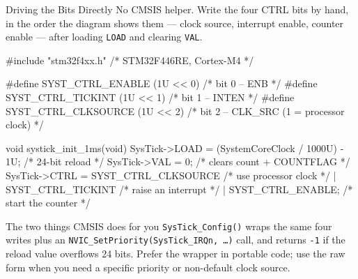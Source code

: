 \documentclass[9pt,aspectratio=169,xcolor=table]{beamer}
\begin{document}
{\beamerextras
\begin{frame}[fragile]{Driving the Bits Directly}
    \leavevmode
    {\small No CMSIS helper. Write the four CTRL bits by hand, in the order
    the diagram shows them --- clock source, interrupt enable, counter
    enable --- after loading \texttt{LOAD} and clearing \texttt{VAL}.}

    \vspace{2mm}
\begin{cc}[basicstyle=\ttfamily\footnotesize]
#include "stm32f4xx.h"                 /* STM32F446RE, Cortex-M4 */

#define SYST_CTRL_ENABLE     (1U << 0) /* bit 0  -- ENB */
#define SYST_CTRL_TICKINT    (1U << 1) /* bit 1  -- INTEN */
#define SYST_CTRL_CLKSOURCE  (1U << 2) /* bit 2  -- CLK_SRC (1 = processor clock) */

void systick_init_1ms(void) {
    SysTick->LOAD = (SystemCoreClock / 1000U) - 1U;   /* 24-bit reload */
    SysTick->VAL  = 0;                                /* clears count + COUNTFLAG */
    SysTick->CTRL = SYST_CTRL_CLKSOURCE               /* use processor clock */
                  | SYST_CTRL_TICKINT                 /* raise an interrupt  */
                  | SYST_CTRL_ENABLE;                 /* start the counter   */
}
\end{cc}

    \begin{block}{The two things CMSIS does for you}
        {\small \texttt{SysTick\_Config()} wraps the same four writes
        \alert{plus} an \texttt{NVIC\_SetPriority(SysTick\_IRQn, \ldots)}
        call, and returns \texttt{-1} if the reload value overflows 24
        bits. Prefer the wrapper in portable code; use the raw form when
        you need a specific priority or non-default clock source.}
    \end{block}
\end{frame}
}
\end{document}
